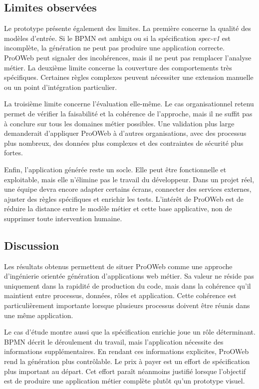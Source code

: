 \subsection{Limites observées}

Le prototype présente également des limites. La première concerne la qualité des modèles d'entrée. Si le BPMN est ambigu ou si la spécification \textit{spec-v1} est incomplète, la génération ne peut pas produire une application correcte. ProOWeb peut signaler des incohérences, mais il ne peut pas remplacer l'analyse métier. La deuxième limite concerne la couverture des comportements très spécifiques. Certaines règles complexes peuvent nécessiter une extension manuelle ou un point d'intégration particulier.

La troisième limite concerne l'évaluation elle-même. Le cas organisationnel retenu permet de vérifier la faisabilité et la cohérence de l'approche, mais il ne suffit pas à conclure sur tous les domaines métier possibles. Une validation plus large demanderait d'appliquer ProOWeb à d'autres organisations, avec des processus plus nombreux, des données plus complexes et des contraintes de sécurité plus fortes.

Enfin, l'application générée reste un socle. Elle peut être fonctionnelle et exploitable, mais elle n'élimine pas le travail du développeur. Dans un projet réel, une équipe devra encore adapter certains écrans, connecter des services externes, ajuster des règles spécifiques et enrichir les tests. L'intérêt de ProOWeb est de réduire la distance entre le modèle métier et cette base applicative, non de supprimer toute intervention humaine.

\subsection{Discussion}

Les résultats obtenus permettent de situer ProOWeb comme une approche d'ingénierie orientée génération d'applications web métier. Sa valeur ne réside pas uniquement dans la rapidité de production du code, mais dans la cohérence qu'il maintient entre processus, données, rôles et application. Cette cohérence est particulièrement importante lorsque plusieurs processus doivent être réunis dans une même application.

Le cas d'étude montre aussi que la spécification enrichie joue un rôle déterminant. BPMN décrit le déroulement du travail, mais l'application nécessite des informations supplémentaires. En rendant ces informations explicites, ProOWeb rend la génération plus contrôlable. Le prix à payer est un effort de spécification plus important au départ. Cet effort paraît néanmoins justifié lorsque l'objectif est de produire une application métier complète plutôt qu'un prototype visuel.


